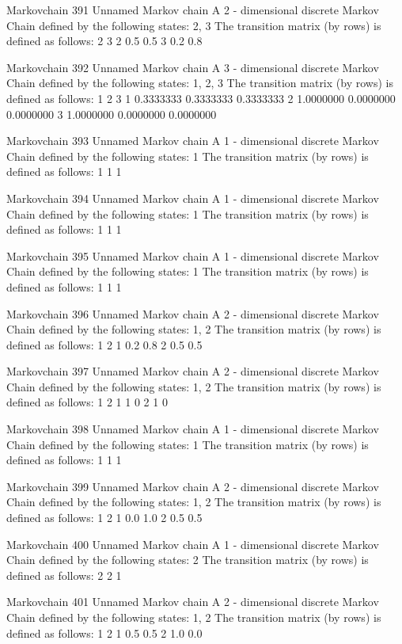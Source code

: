 \documentclass[
  nojss]{jss}
\begin{document}
\begin{CodeChunk}
\begin{CodeOutput}
Markovchain  391 
Unnamed Markov chain 
 A  2 - dimensional discrete Markov Chain defined by the following states: 
 2, 3 
 The transition matrix  (by rows)  is defined as follows: 
    2   3
2 0.5 0.5
3 0.2 0.8

Markovchain  392 
Unnamed Markov chain 
 A  3 - dimensional discrete Markov Chain defined by the following states: 
 1, 2, 3 
 The transition matrix  (by rows)  is defined as follows: 
          1         2         3
1 0.3333333 0.3333333 0.3333333
2 1.0000000 0.0000000 0.0000000
3 1.0000000 0.0000000 0.0000000

Markovchain  393 
Unnamed Markov chain 
 A  1 - dimensional discrete Markov Chain defined by the following states: 
 1 
 The transition matrix  (by rows)  is defined as follows: 
  1
1 1

Markovchain  394 
Unnamed Markov chain 
 A  1 - dimensional discrete Markov Chain defined by the following states: 
 1 
 The transition matrix  (by rows)  is defined as follows: 
  1
1 1

Markovchain  395 
Unnamed Markov chain 
 A  1 - dimensional discrete Markov Chain defined by the following states: 
 1 
 The transition matrix  (by rows)  is defined as follows: 
  1
1 1

Markovchain  396 
Unnamed Markov chain 
 A  2 - dimensional discrete Markov Chain defined by the following states: 
 1, 2 
 The transition matrix  (by rows)  is defined as follows: 
    1   2
1 0.2 0.8
2 0.5 0.5

Markovchain  397 
Unnamed Markov chain 
 A  2 - dimensional discrete Markov Chain defined by the following states: 
 1, 2 
 The transition matrix  (by rows)  is defined as follows: 
  1 2
1 1 0
2 1 0

Markovchain  398 
Unnamed Markov chain 
 A  1 - dimensional discrete Markov Chain defined by the following states: 
 1 
 The transition matrix  (by rows)  is defined as follows: 
  1
1 1

Markovchain  399 
Unnamed Markov chain 
 A  2 - dimensional discrete Markov Chain defined by the following states: 
 1, 2 
 The transition matrix  (by rows)  is defined as follows: 
    1   2
1 0.0 1.0
2 0.5 0.5

Markovchain  400 
Unnamed Markov chain 
 A  1 - dimensional discrete Markov Chain defined by the following states: 
 2 
 The transition matrix  (by rows)  is defined as follows: 
  2
2 1

Markovchain  401 
Unnamed Markov chain 
 A  2 - dimensional discrete Markov Chain defined by the following states: 
 1, 2 
 The transition matrix  (by rows)  is defined as follows: 
    1   2
1 0.5 0.5
2 1.0 0.0


\end{CodeOutput}
\end{CodeChunk}
\end{document}
